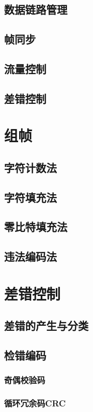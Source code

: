 \documentclass[lang=cn,newtx,10pt,scheme=chinese]{../../elegantbook}
\begin{document}
\subsection{数据链路管理}
\subsection{帧同步}
\subsection{流量控制}
\subsection{差错控制}



\section{组帧}
\subsection{字符计数法}
\subsection{字符填充法}
\subsection{零比特填充法}
\subsection{违法编码法}

\section{差错控制}
\subsection{差错的产生与分类}
\subsection{检错编码}
\subsubsection{奇偶校验码}
\subsubsection{循环冗余码CRC}
\end{document}
